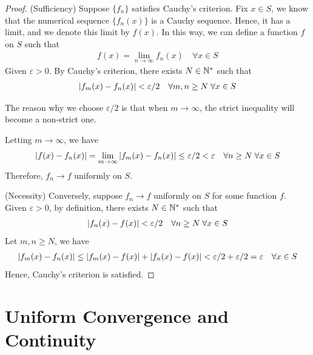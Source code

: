 \documentclass[thmcnt=section, 12pt]{my-elegantbook}
\begin{document}
\begin{proof}
    (Sufficiency) Suppose $\{f_n\}$ satisfies Cauchy's criterion. Fix $x \in S$, we know that the numerical sequence $\{f_n(x)\}$ is a Cauchy sequence. Hence, it has a limit, and we denote this limit by $f(x)$. In this way, we can define a function $f$ on $S$ such that
    \begin{align*}
        f(x) = \lim_{n \to \infty} f_n(x)
        \quad \forall x \in S
    \end{align*}
    Given $\varepsilon > 0$. By Cauchy's criterion, there exists $N \in \mathbb{N}^\ast$ such that
    \begin{align*}
        \left\lvert f_m(x) - f_n(x) \right\rvert < \varepsilon / 2
        \quad \forall m, n \geq N \;
        \forall x \in S
    \end{align*}
    \begin{note}
        The reason why we choose $\varepsilon / 2$ is that when $m \to \infty$, the strict inequality will become a non-strict one.
    \end{note}
    Letting $m \to \infty$, we have
    \begin{align*}
        \left\lvert f(x) - f_n(x) \right\rvert
        = \lim_{m \to \infty} \left\lvert f_m(x) - f_n(x) \right\rvert \leq \varepsilon / 2
        < \varepsilon
        \quad \forall n \geq N \;
        \forall x \in S
    \end{align*}
    Therefore, $f_n \to f$ uniformly on $S$.

    (Necessity) Conversely, suppose $f_n \to f$ uniformly on $S$ for some function $f$. Given $\varepsilon > 0$, by definition, there exists $N \in \mathbb{N}^\ast$ such that
    \begin{align*}
        \left\lvert f_n(x) - f(x) \right\rvert < \varepsilon / 2
        \quad \forall n \geq N \;
        \forall x \in S
    \end{align*}
    Let $m, n \geq N$, we have
    \begin{align*}
        \left\lvert f_m(x) - f_n(x) \right\rvert
        \leq \left\lvert f_m(x) - f(x) \right\rvert
        + \left\lvert f_n(x) - f(x) \right\rvert
        < \varepsilon / 2 + \varepsilon / 2
        = \varepsilon
        \quad \forall x \in S
    \end{align*}
    Hence, Cauchy's criterion is satisfied.
\end{proof}


\section{Uniform Convergence and Continuity}
\end{document}
